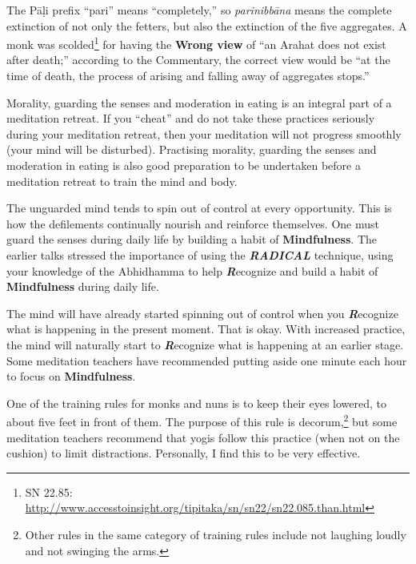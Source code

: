 The Pāḷi prefix “pari” means “completely,” so \textit{parinibbāna} means the complete extinction of not only the fetters, but also the extinction of the five aggregates. A monk was scolded\footnote{SN 22.85: \url{ http://www.accesstoinsight.org/tipitaka/sn/sn22/sn22.085.than.html}} for having the \textbf{Wrong view} of “an Arahat does not exist after death;” according to the Commentary, the correct view would be “at the time of death, the process of arising and falling away of aggregates stops.”


Morality, guarding the senses and moderation in eating is an integral part of a meditation retreat. If you “cheat” and do not take these practices seriously during your meditation retreat, then your meditation will not progress smoothly (your mind will be disturbed). Practising morality, guarding the senses and moderation in eating is also good preparation to be undertaken before a meditation retreat to train the mind and body. 


The unguarded mind tends to spin out of control at every opportunity. This is how the defilements continually nourish and reinforce themselves. One must guard the senses during daily life by building a habit of \textbf{Mindfulness}. The earlier talks stressed the importance of using the \textbf{\textit{RADICAL}} technique, using your knowledge of the Abhidhamma to help \textbf{\textit{R}}ecognize and build a habit of \textbf{Mindfulness} during daily life.

The mind will have already started spinning out of control when you \textbf{\textit{R}}ecognize what is happening in the present moment. That is okay. With increased practice, the mind will naturally start to \textbf{\textit{R}}ecognize what is happening at an earlier stage. Some meditation teachers have recommended putting aside one minute each hour to focus on \textbf{Mindfulness}. 

One of the training rules for monks and nuns is to keep their eyes lowered, to about five feet in front of them. The purpose of this rule is decorum,\footnote{Other rules in the same category of training rules include not laughing loudly and not swinging the arms.} but some meditation teachers recommend that yogis follow this practice (when not on the cushion) to limit distractions. Personally, I find this to be very effective.